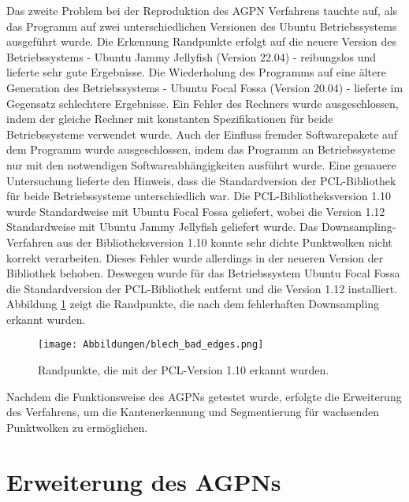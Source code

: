 Das zweite Problem bei der Reproduktion des AGPN Verfahrens tauchte auf, als das Programm auf zwei unterschiedlichen Versionen des Ubuntu Betriebssystems ausgeführt wurde. Die Erkennung Randpunkte erfolgt auf die neuere Version des Betriebssystems - Ubuntu Jammy Jellyfish (Version 22.04) - reibungslos und lieferte sehr gute Ergebnisse. Die Wiederholung des Programms auf eine ältere Generation des Betriebssystems - Ubuntu Focal Fossa (Version 20.04) - lieferte im Gegensatz schlechtere Ergebnisse. Ein Fehler des Rechners wurde ausgeschlossen, indem der gleiche Rechner mit konstanten Spezifikationen für beide Betriebssysteme verwendet wurde. Auch der Einfluss fremder Softwarepakete auf dem Programm wurde ausgeschlossen, indem das Programm an Betriebssysteme nur mit den notwendigen Softwareabhängigkeiten ausführt wurde. Eine genauere Untersuchung lieferte den Hinweis, dass die Standardversion der PCL-Bibliothek für beide Betriebssysteme unterschiedlich war. Die PCL-Bibliotheksversion 1.10 wurde Standardweise mit Ubuntu Focal Fossa geliefert, wobei die Version 1.12 Standardweise mit Ubuntu Jammy Jellyfish geliefert wurde. Das Downsampling-Verfahren aus der Bibliotheksversion 1.10 konnte sehr dichte Punktwolken nicht korrekt verarbeiten. Dieses Fehler wurde allerdings in der neueren Version der Bibliothek behoben. Deswegen wurde für das Betriebssystem Ubuntu Focal Fossa die Standardversion der PCL-Bibliothek entfernt und die Version 1.12 installiert. Abbildung \ref{bad_edges} zeigt die Randpunkte, die nach dem fehlerhaften Downsampling erkannt wurden.

\begin{figure}[h]
	\texttt{[image: Abbildungen/blech\_bad\_edges.png]}
	\centering
	\caption{Randpunkte, die mit der PCL-Version 1.10 erkannt wurden.}
	\label{bad_edges}
\end{figure}

Nachdem die Funktionsweise des AGPNs getestet wurde, erfolgte die Erweiterung des Verfahrens, um die Kantenerkennung und Segmentierung für wachsenden Punktwolken zu ermöglichen.

\section{Erweiterung des AGPNs}
